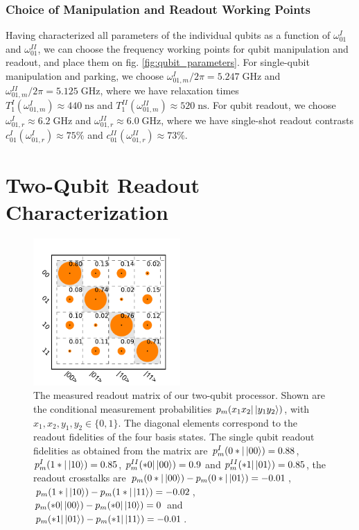 \subsubsection{Choice of Manipulation and Readout Working Points}

Having characterized all parameters of the individual qubits as a function of $\omega_{01}^I$ and $\omega_{01}^{II}$, we can choose the frequency working points for qubit manipulation and readout, and place them on fig. \ref{fig:qubit_parameters}. For single-qubit manipulation and parking, we choose \mbox{$\omega_{01,m}^I/2\pi = 5.247\;\mathrm{GHz}$} and \mbox{$\omega_{01,m}^{II}/2\pi = 5.125\;\mathrm{GHz}$}, where we have relaxation times \\ \mbox{$T_1^I(\omega_{01,m}^I) \approx 440\;\mathrm{ns}$} and \mbox{$T_1^{II}(\omega_{01,m}^{II})\approx 520\;\mathrm{ns}$}. For qubit readout, we choose \mbox{$\omega_{01,r}^I \approx 6.2\;\mathrm{GHz}$} and \mbox{$\omega_{01,r}^{II}\approx 6.0\;\mathrm{GHz}$}, where we have single-shot readout contrasts \mbox{$c_{01}^I(\omega_{01,r}^I)\approx 75\%$} and \mbox{$c_{01}^{II}(\omega_{01,r}^{II})\approx 73\%$}.

\section{Two-Qubit Readout Characterization} \label{section:readout_matrix}

\begin{figure}
	\centering
	\includegraphics[width=0.5\textwidth]{"./data/ct5/2011_04_21 - grover and tomo/good_data/readout_matrix_no_shelving"}
	\caption{The measured readout matrix of our two-qubit processor. Shown are the conditional measurement probabilities $p_m(x_{1}x_{2}|\left| y_{1}y_2 \right>)$, with $x_1,x_2,y_1,y_2\in\{0,1\}$. The diagonal elements correspond to the readout fidelities of the four basis states. The single qubit readout fidelities as obtained from the matrix are $p_m^I(0*|\left| 00 \right>)=0.88$, $p_m^I(1*|\left| 10 \right>)=0.85$, $p_m^{II}(*0|\left| 00 \right>)=0.9$ and $p_m^{II}(*1|\left| 01 \right>)=0.85$, the readout crosstalks are $p_m(0*|\left| 00 \right>) - p_m(0*|\left| 01 \right>)=-0.01$, $p_m(1*|\left| 10 \right>) - p_m(1*|\left| 11 \right>)=-0.02$, $p_m(*0|\left| 00 \right>) - p_m(*0|\left| 10 \right>)=0$ and $p_m(*1|\left| 01 \right>) - p_m(*1|\left| 11 \right>)=-0.01$.}
	\label{fig:readout_matrix_no_shelving}
\end{figure}

